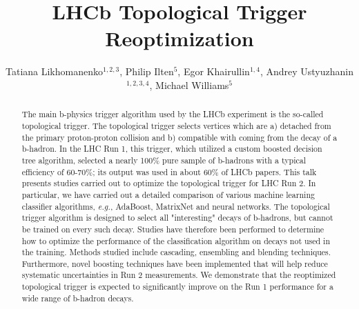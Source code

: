\documentclass[a4paper]{jpconf}
\begin{document}
\title{LHCb Topological Trigger Reoptimization}

\author{Tatiana Likhomanenko$^{1, 2, 3}$, Philip Ilten$^{5}$, Egor Khairullin$^{1, 4}$, Andrey Ustyuzhanin$^{1, 2, 3, 4}$, Michael Williams$^{5}$}

\address{$^1$ Yandex School of Data Analysis (YSDA), RU}
\address{$^2$ National Research University Higher School of Economics (HSE), RU}
\address{$^3$ NRC "Kurchatov Institute", RU}
\address{$^4$ Moscow Institute of Physics and Technology, Moscow, RU}
\address{$^5$ Massachusetts Institute of Technology, US}



\begin{abstract}
The main b-physics trigger algorithm used by the LHCb experiment is the so-called topological trigger. The topological trigger selects vertices which are a) detached from the primary proton-proton collision and b) compatible with coming from the decay of a b-hadron. In the LHC Run 1, this trigger, which utilized a custom boosted decision tree algorithm, selected a nearly 100\% pure sample of b-hadrons with a typical efficiency of 60-70\%; its output was used in about 60\% of LHCb papers. This talk presents studies carried out to optimize the topological trigger for LHC Run 2. In particular, we have carried out a detailed comparison of various machine learning classifier algorithms, {\em  e.g.}, AdaBoost, MatrixNet and neural networks. The topological trigger algorithm is designed to select all "interesting" decays of b-hadrons, but cannot be trained on every such decay. Studies have therefore been performed to determine how to optimize the performance of the classification algorithm on decays not used in the training. Methods studied include cascading, ensembling and blending techniques. Furthermore, novel boosting techniques have been implemented that will help reduce systematic uncertainties in Run 2 measurements. We demonstrate that the reoptimized topological trigger is expected to significantly improve on the Run 1 performance for a wide range of b-hadron decays.\end{abstract}
\end{document}
